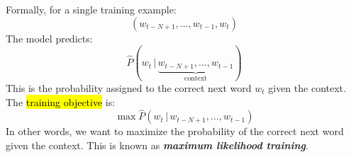 \highspace
Formally, for a single training example:
\begin{equation*}
    \left(w_{t-N+1}, \dots, w_{t-1}, w_t\right)
\end{equation*}
The model predicts:
\begin{equation*}
    \hat{P}(w_t \, | \, \underbrace{w_{t-N+1}, \dots, w_{t-1}}_{\text{context}})
\end{equation*}
This is the probability assigned to the correct next word $w_t$ given the context. The \hl{training objective} is:
\begin{equation*}
    \max \hat{P}(w_t \, | \, w_{t-N+1}, \dots, w_{t-1})
\end{equation*}
In other words, we want to maximize the probability of the correct next word given the context. This is known as \emph{\textbf{maximum likelihood training}}.

